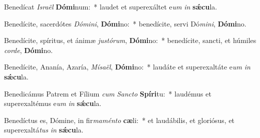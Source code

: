 \item Benedícat \textit{Is}\textit{ra}\textit{ël} \textbf{Dó}\textbf{mi}num:~* laudet et superexáltet e\textit{um} \textit{in} \textbf{sǽ}\textbf{cu}la.
\item Benedícite, sacerdótes \textit{Dó}\textit{mi}\textit{ni}, \textbf{Dó}\textbf{mi}no:~* benedícite, servi Dó\textit{mi}\textit{ni}, \textbf{Dó}\textbf{mi}no.
\item Benedícite, spíritus, et ánimæ \textit{jus}\textit{tó}\textit{rum}, \textbf{Dó}\textbf{mi}no:~* benedícite, sancti, et húmiles \textit{cor}\textit{de}, \textbf{Dó}\textbf{mi}no.
\item Benedícite, Ananía, Azaría, \textit{Mí}\textit{sa}\textit{ël}, \textbf{Dó}\textbf{mi}no:~* laudáte et superexaltáte e\textit{um} \textit{in} \textbf{sǽ}\textbf{cu}la.
\item Benedicámus Patrem et Fílium \textit{cum} \textit{Sanc}\textit{to} \textbf{Spí}\textbf{ri}tu:~* laudémus et superexaltémus e\textit{um} \textit{in} \textbf{sǽ}\textbf{cu}la.
\item Benedíctus es, Dómine, in fir\textit{ma}\textit{mén}\textit{to} \textbf{cæ}li:~* et laudábilis, et gloriósus, et superexaltá\textit{tus} \textit{in} \textbf{sǽ}\textbf{cu}la.
